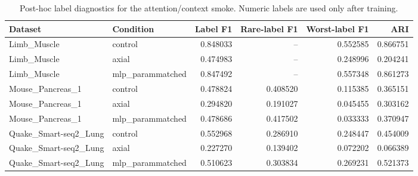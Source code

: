 \begin{table}[ht]
\centering
\caption{Post-hoc label diagnostics for the attention/context smoke. Numeric labels are used only after training.}
\label{tab:generated-attention-posthoc-labels}
\begin{tabular}{llrrrr}
\toprule
Dataset & Condition & Label F1 & Rare-label F1 & Worst-label F1 & ARI \\
\midrule
Limb\_Muscle & control & 0.848033 & -- & 0.552585 & 0.866751 \\
Limb\_Muscle & axial & 0.474983 & -- & 0.248996 & 0.204241 \\
Limb\_Muscle & mlp\_parammatched & 0.847492 & -- & 0.557348 & 0.861273 \\
Mouse\_Pancreas\_1 & control & 0.478824 & 0.408520 & 0.115385 & 0.365151 \\
Mouse\_Pancreas\_1 & axial & 0.294820 & 0.191027 & 0.045455 & 0.303162 \\
Mouse\_Pancreas\_1 & mlp\_parammatched & 0.478686 & 0.417502 & 0.033333 & 0.370947 \\
Quake\_Smart-seq2\_Lung & control & 0.552968 & 0.286910 & 0.248447 & 0.454009 \\
Quake\_Smart-seq2\_Lung & axial & 0.227270 & 0.139402 & 0.072202 & 0.066389 \\
Quake\_Smart-seq2\_Lung & mlp\_parammatched & 0.510623 & 0.303834 & 0.269231 & 0.521373 \\
\bottomrule
\end{tabular}
\end{table}
